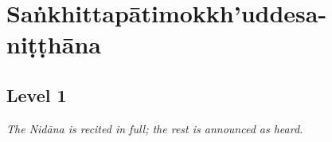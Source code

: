 
\section{Saṅkhittapātimokkh'uddesa-niṭṭhāna}
\label{sankhittapatimokkh'uddesa-nitthana}

\ifafiveversion\vspace{0.15cm}\fi
\ifninebythirteenversion\vspace{0.15cm}\fi

{}
\subsection*{Level 1}
\label{in-brief-level1}

\textit{The Nidāna is recited in full; the rest is announced as heard.}

\smallskip

